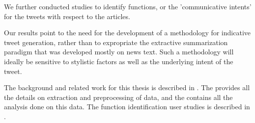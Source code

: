 We further conducted studies to identify functions, or the 'communicative intents' for the tweets with respect to the articles.

Our results point to the need for the development of a methodology for indicative tweet generation, rather than to expropriate the extractive summarization paradigm that was developed mostly on news text. Such a methodology will ideally be sensitive to stylistic factors as well as the underlying intent of the tweet.



The background and related work for this thesis is described in . The  provides all the details on extraction and preprocessing of data, and the  contains all the analysis done on this data. The function identification user studies is described in .  